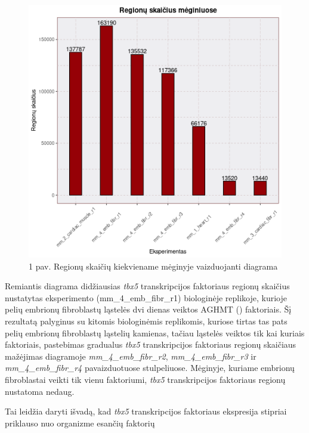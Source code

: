 \documentclass[12pt]{article}
\begin{document}
\begin{figure}[htb]
\caption*{1 pav. Regionų skaičių kiekviename mėginyje vaizduojanti diagrama}
\begin{center}
\includegraphics[width=0.6\linewidth]{Figures/total_peak_counts.png}
\end{center}
\end{figure}

Remiantis diagrama didžiausias \emph{tbx5} transkripcijos faktoriaus
regionų skaičius nustatytas eksperimento (mm_4_emb_fibr_r1)
biologinėje replikoje, kurioje pelių embrionų fibroblastų ląstelės
dvi dienas veiktos AGHMT () faktoriais.
Šį rezultatą palyginus su kitomis biologinėmis replikomis, kuriose
tirtas tas pats pelių embrionų fibroblastų ląstelių kamienas, tačiau
ląstelės veiktos tik kai kuriais faktoriais, pastebimas gradualus
\emph{tbx5} transkripcijos faktoriaus regionų skaičiaus mažėjimas
diagramoje \emph{mm_4_emb_fibr_r2}, \emph{mm_4_emb_fibr_r3} ir
\emph{mm_4_emb_fibr_r4} pavaizduotuose stulpeliuose. Mėginyje,
kuriame embrionų fibroblastai veikti tik vienu faktoriumi,
\emph{tbx5} transkripcijos faktoriaus regionų nustatoma nedaug.

Tai leidžia daryti išvadą, kad \emph{tbx5} transkripcijos faktoriaus
ekspresija stipriai priklauso nuo organizme esančių faktorių



\newpage

\end{document}

